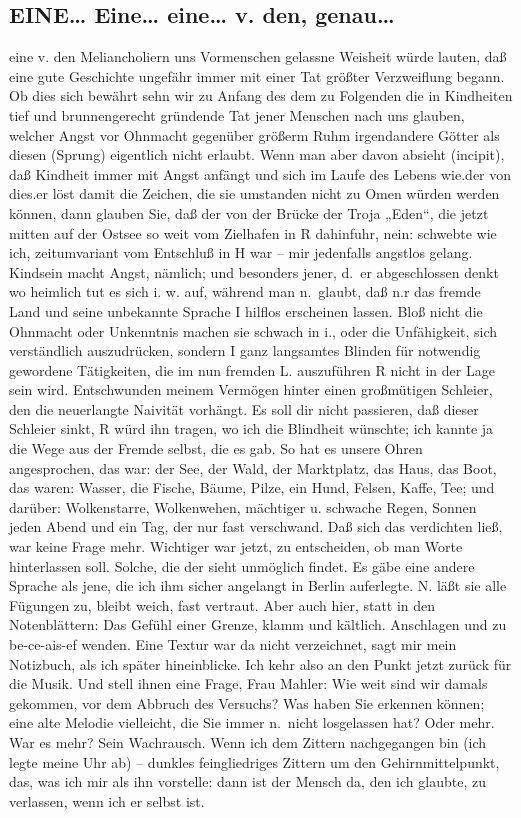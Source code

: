 \documentclass[
]{article}
\author{}
\date{\vspace{-2.5em}}
\begin{document}
\subsection{EINE\ldots{} Eine\ldots{} eine\ldots{} v. den,
genau\ldots{}}\label{eine-eine-eine-v.-den-genau}

eine v. den Meliancholiern uns Vormenschen gelassne Weisheit würde
lauten, daß eine gute Geschichte ungefähr immer mit einer Tat größter
Verzweiflung begann. Ob dies sich bewährt sehn wir zu Anfang des dem zu
Folgenden die in Kindheiten tief und brunnengerecht gründende Tat jener
Menschen nach uns glauben, welcher Angst vor Ohnmacht gegenüber größerm
Ruhm irgendandere Götter als diesen (Sprung) eigentlich nicht erlaubt.
Wenn man aber davon absieht (incipit), daß Kindheit immer mit Angst
anfängt und sich im Laufe des Lebens wie.der von dies.er löst damit die
Zeichen, die sie umstanden nicht zu Omen würden werden können, dann
glauben Sie, daß der von der Brücke der Troja „Eden``, die jetzt mitten
auf der Ostsee so weit vom Zielhafen in R dahinfuhr, nein: schwebte wie
ich, zeitumvariant vom Entschluß in H war -- mir jedenfalls angstlos
gelang. Kindsein macht Angst, nämlich; und besonders jener, d.~er
abgeschlossen denkt wo heimlich tut es sich i. w. auf, während man
n.~glaubt, daß n.r das fremde Land und seine unbekannte Sprache I
hilflos erscheinen lassen. Bloß nicht die Ohnmacht oder Unkenntnis
machen sie schwach in i., oder die Unfähigkeit, sich verständlich
auszudrücken, sondern I ganz langsamtes Blinden für notwendig gewordene
Tätigkeiten, die im nun fremden L. auszuführen R nicht in der Lage sein
wird. Entschwunden meinem Vermögen hinter einen großmütigen Schleier,
den die neuerlangte Naivität vorhängt. Es soll dir nicht passieren, daß
dieser Schleier sinkt, R würd ihn tragen, wo ich die Blindheit wünschte;
ich kannte ja die Wege aus der Fremde selbst, die es gab. So hat es
unsere Ohren angesprochen, das war: der See, der Wald, der Marktplatz,
das Haus, das Boot, das waren: Wasser, die Fische, Bäume, Pilze, ein
Hund, Felsen, Kaffe, Tee; und darüber: Wolkenstarre, Wolkenwehen,
mächtiger u. schwache Regen, Sonnen jeden Abend und ein Tag, der nur
fast verschwand. Daß sich das verdichten ließ, war keine Frage mehr.
Wichtiger war jetzt, zu entscheiden, ob man Worte hinterlassen soll.
Solche, die der sieht unmöglich findet. Es gäbe eine andere Sprache als
jene, die ich ihm sicher angelangt in Berlin auferlegte. N. läßt sie
alle Fügungen zu, bleibt weich, fast vertraut. Aber auch hier, statt in
den Notenblättern: Das Gefühl einer Grenze, klamm und kältlich.
Anschlagen und zu be-ce-ais-ef wenden. Eine Textur war da nicht
verzeichnet, sagt mir mein Notizbuch, als ich später hineinblicke. Ich
kehr also an den Punkt jetzt zurück für die Musik. Und stell ihnen eine
Frage, Frau Mahler: Wie weit sind wir damals gekommen, vor dem Abbruch
des Versuchs? Was haben Sie erkennen können; eine alte Melodie
vielleicht, die Sie immer n.~nicht losgelassen hat? Oder mehr. War es
mehr? Sein Wachrausch. Wenn ich dem Zittern nachgegangen bin (ich legte
meine Uhr ab) -- dunkles feingliedriges Zittern um den
Gehirnmittelpunkt, das, was ich mir als ihn vorstelle: dann ist der
Mensch da, den ich glaubte, zu verlassen, wenn ich er selbst ist.
\end{document}
